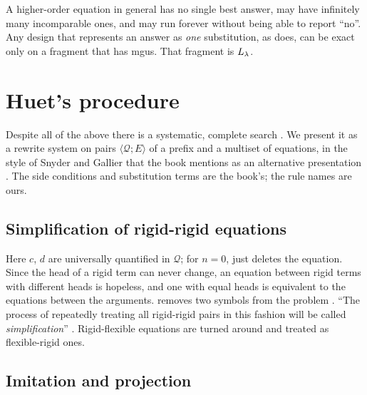 \begin{pitfall}
A higher-order equation in general has no single best answer, may have infinitely many incomparable ones, and
may run forever without being able to report \enquote{no}. Any design that represents an answer as \emph{one}
substitution, as \micro{} does, can be exact only on a fragment that has mgus. That fragment is $L_\lambda$.
\end{pitfall}

\section{Huet's procedure}\label{sec:hounif-huet}

Despite all of the above there is a systematic, complete search . We present it as a rewrite system on
pairs $\langle\mathcal Q;E\rangle$ of a prefix and a multiset of equations, in the style of Snyder and Gallier
that the book mentions as an alternative presentation . The side conditions and substitution terms
are the book's; the rule names are ours.

\subsection{Simplification of rigid-rigid equations}

Here $c$, $d$ are universally quantified in $\mathcal Q$; for $n=0$,  just deletes the equation.
Since the head of a rigid term can never change, an equation between rigid terms with different heads is
hopeless, and one with equal heads is equivalent to the equations between the arguments.  removes
two symbols from the problem . \enquote{The process of repeatedly treating all rigid-rigid pairs in this
fashion will be called \emph{simplification}} . Rigid-flexible equations are turned around and treated
as flexible-rigid ones.

\subsection{Imitation and projection}


